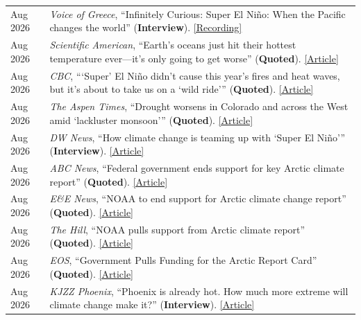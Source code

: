 \documentclass[margin,line,palatino,courier,10pt]{res}
\begin{document}
\begin{resume}
\begin{tabular}{@{}p{0.9in}p{4in}}
Aug 2026 & \textit{Voice of Greece}, ``Infinitely Curious: Super El Ni\~{n}o: When the Pacific changes the world'' (\textbf{Interview}). \href{https://vog.ert.gr/ondemand/infinitely-curious-super-el-nino-when-the-pacific-changes-the-world-30-aug-2026/?lang=en}{[Recording]}\\
Aug 2026 & \textit{Scientific American}, ``Earth's oceans just hit their hottest temperature ever—it’s only going to get worse'' (\textbf{Quoted}). \href{https://www.scientificamerican.com/article/earths-oceans-just-hit-their-hottest-temperature-ever-recorded/}{[Article]}\\
Aug 2026 & \textit{CBC}, ```Super' El Ni\~{n}o didn't cause this year's fires and heat waves, but it's about to take us on a `wild ride''' (\textbf{Quoted}). \href{https://www.cbc.ca/news/climate/el-nino-2026-extreme-weather-9.7313170}{[Article]}\\
Aug 2026 & \textit{The Aspen Times}, ``Drought worsens in Colorado and across the West amid `lackluster monsoon''' (\textbf{Quoted}). \href{https://www.aspentimes.com/news/colorado-drought-worsens/}{[Article]}\\
Aug 2026 & \textit{DW News}, ``How climate change is teaming up with `Super El Ni\~{n}o''' (\textbf{Interview}). \href{https://www.youtube.com/watch?v=qX1JDtJLQhg}{[Article]}\\
Aug 2026 & \textit{ABC News}, ``Federal government ends support for key Arctic climate report'' (\textbf{Quoted}). \href{https://abcnews.com/US/federal-government-ends-support-key-arctic-climate-report/story?id=135559206}{[Article]}\\
Aug 2026 & \textit{E\&E News}, ``NOAA to end support for Arctic climate change report'' (\textbf{Quoted}). \href{https://www.eenews.net/articles/noaa-to-end-support-for-arctic-climate-change-report/}{[Article]}\\
Aug 2026 & \textit{The Hill}, ``NOAA pulls support from Arctic climate report'' (\textbf{Quoted}). \href{https://thehill.com/policy/energy-environment/6023519-noaa-ends-arctic-report-card-support/}{[Article]}\\
Aug 2026 & \textit{EOS}, ``Government Pulls Funding for the Arctic Report Card'' (\textbf{Quoted}). \href{https://eos.org/research-and-developments/government-pulls-funding-for-the-arctic-report-card}{[Article]}\\
Aug 2026 & \textit{KJZZ Phoenix}, ``Phoenix is already hot. How much more extreme will climate change make it?'' (\textbf{Interview}). \href{https://www.kjzz.org/science/2026-08-10/phoenix-is-already-hot-how-much-more-extreme-will-climate-change-make-it}{[Article]}\\

\end{tabular}
\end{resume}
\end{document}
